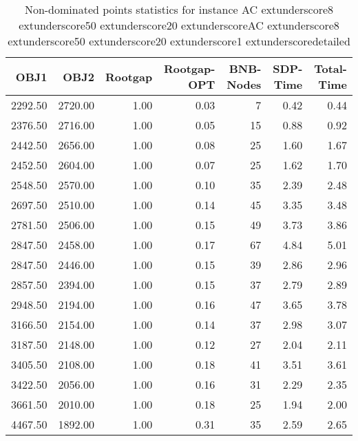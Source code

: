 \begin{table}
\caption{Non-dominated points statistics for instance AC	extunderscore8	extunderscore50	extunderscore20	extunderscoreAC	extunderscore8	extunderscore50	extunderscore20	extunderscore1	extunderscoredetailed}
\label{tab:stats/AC_8_50_20_AC_8_50_20_1_detailed}
\begin{tabular}{rrrrrrr}
\toprule
OBJ1 & OBJ2 & Rootgap & Rootgap-OPT & BNB-Nodes & SDP-Time & Total-Time \\
\midrule
2292.50 & 2720.00 & 1.00 & 0.03 & 7 & 0.42 & 0.44 \\
2376.50 & 2716.00 & 1.00 & 0.05 & 15 & 0.88 & 0.92 \\
2442.50 & 2656.00 & 1.00 & 0.08 & 25 & 1.60 & 1.67 \\
2452.50 & 2604.00 & 1.00 & 0.07 & 25 & 1.62 & 1.70 \\
2548.50 & 2570.00 & 1.00 & 0.10 & 35 & 2.39 & 2.48 \\
2697.50 & 2510.00 & 1.00 & 0.14 & 45 & 3.35 & 3.48 \\
2781.50 & 2506.00 & 1.00 & 0.15 & 49 & 3.73 & 3.86 \\
2847.50 & 2458.00 & 1.00 & 0.17 & 67 & 4.84 & 5.01 \\
2847.50 & 2446.00 & 1.00 & 0.15 & 39 & 2.86 & 2.96 \\
2857.50 & 2394.00 & 1.00 & 0.15 & 37 & 2.79 & 2.89 \\
2948.50 & 2194.00 & 1.00 & 0.16 & 47 & 3.65 & 3.78 \\
3166.50 & 2154.00 & 1.00 & 0.14 & 37 & 2.98 & 3.07 \\
3187.50 & 2148.00 & 1.00 & 0.12 & 27 & 2.04 & 2.11 \\
3405.50 & 2108.00 & 1.00 & 0.18 & 41 & 3.51 & 3.61 \\
3422.50 & 2056.00 & 1.00 & 0.16 & 31 & 2.29 & 2.35 \\
3661.50 & 2010.00 & 1.00 & 0.18 & 25 & 1.94 & 2.00 \\
4467.50 & 1892.00 & 1.00 & 0.31 & 35 & 2.59 & 2.65 \\
\bottomrule
\end{tabular}
\end{table}
